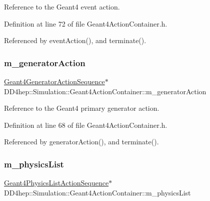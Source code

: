 Reference to the Geant4 event action. 



Definition at line 72 of file Geant4\+Action\+Container.\+h.



Referenced by event\+Action(), and terminate().

\hypertarget{class_d_d4hep_1_1_simulation_1_1_geant4_action_container_acbb02aa950b5dc79ca78448a5ff23994}{}\label{class_d_d4hep_1_1_simulation_1_1_geant4_action_container_acbb02aa950b5dc79ca78448a5ff23994} 
\subsubsection{\texorpdfstring{m\+\_\+generator\+Action}{m\_generatorAction}}
{\footnotesize\ttfamily \hyperlink{class_d_d4hep_1_1_simulation_1_1_geant4_generator_action_sequence}{Geant4\+Generator\+Action\+Sequence}$\ast$ D\+D4hep\+::\+Simulation\+::\+Geant4\+Action\+Container\+::m\+\_\+generator\+Action\hspace{0.3cm}{\ttfamily [protected]}}



Reference to the Geant4 primary generator action. 



Definition at line 68 of file Geant4\+Action\+Container.\+h.



Referenced by generator\+Action(), and terminate().

\hypertarget{class_d_d4hep_1_1_simulation_1_1_geant4_action_container_a8cd72bfb49bd3d62e899591ae65fe7dd}{}\label{class_d_d4hep_1_1_simulation_1_1_geant4_action_container_a8cd72bfb49bd3d62e899591ae65fe7dd} 
\subsubsection{\texorpdfstring{m\+\_\+physics\+List}{m\_physicsList}}
{\footnotesize\ttfamily \hyperlink{class_d_d4hep_1_1_simulation_1_1_geant4_physics_list_action_sequence}{Geant4\+Physics\+List\+Action\+Sequence}$\ast$ D\+D4hep\+::\+Simulation\+::\+Geant4\+Action\+Container\+::m\+\_\+physics\+List\hspace{0.3cm}{\ttfamily [protected]}}



